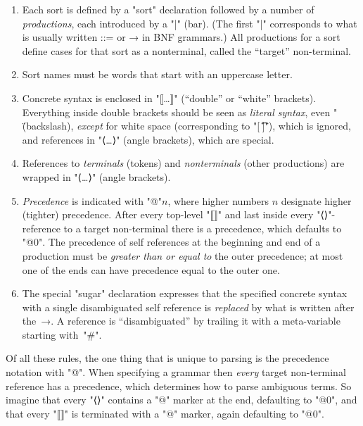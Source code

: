 \documentclass[12pt]{article} %
\begin{document}
\begin{notation}\leavevmode
  \begin{enumerate}

  \item Each sort is defined by a "sort" declaration followed by a number of \emph{productions},
    each introduced by a "|" (bar). (The first "|" corresponds to what is usually written ::= or →
    in BNF grammars.)  All productions for a sort define cases for that sort as a nonterminal,
    called the ``target'' non-terminal.

  \item Sort names must be words that start with an uppercase letter.

  \item Concrete syntax is enclosed in "⟦…⟧" (``double'' or ``white'' brackets). Everything inside
    double brackets should be seen as \emph{literal syntax}, even "\" (backslash), \emph{except} for
    \HAX white space (corresponding to "[\ \t\n\r]"), which is ignored, and references in "⟨…⟩" (angle
    brackets), which are special.

  \item References to \emph{terminals} (tokens) and \emph{nonterminals} (other productions) are
    wrapped in "⟨…⟩" (angle brackets).

  \item \emph{Precedence} is indicated with "@"$n$, where higher numbers $n$ designate higher
    (tighter) precedence. After every top-level "⟦⟧" and last inside every "⟨⟩"-reference to a
    target non-terminal there is a precedence, which defaults to "@0".  The precedence of self
    references at the beginning and end of a production must be \emph{greater than or equal to} the
    outer precedence; at most one of the ends can have precedence equal to the outer one.

  \item The special "sugar" declaration expresses that the specified concrete syntax with a single
    disambiguated self reference is \emph{replaced} by what is written after the~→. A reference is
    ``disambiguated'' by trailing it with a meta-variable starting with~"#".

  \end{enumerate}
  Of all these rules, the one thing that is unique to parsing is the precedence notation with "@".
  When specifying a grammar then \emph{every} target non-terminal reference has a precedence, which
  determines how to parse ambiguous terms. So imagine that every "⟨⟩" contains a "@" marker at the
  end, defaulting to "@0", and that every "⟦⟧" is terminated with a "@" marker, again defaulting to
  "@0".
\end{notation}
\end{document}

